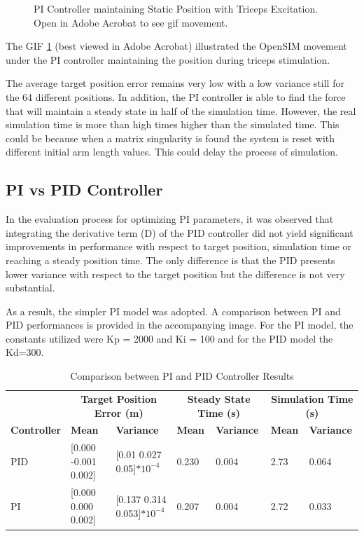 \begin{figure}[h]
    \centering
    \caption{PI Controller maintaining Static Position with Triceps Excitation. Open in Adobe Acrobat to see gif movement.}
    \label{gif:PICONTROLLER1}
\end{figure}

The GIF \ref{gif:PICONTROLLER1} (best viewed in Adobe Acrobat) illustrated the OpenSIM movement under the PI controller  maintaining the position during triceps stimulation.

The average target position error remains very low with a low variance still for the 64 different positions. In addition, the PI controller is able to find the force that will maintain a steady state in half of the simulation time. However, the real simulation time is more than high times higher than the simulated time. This could be because when a matrix singularity is found the system is reset with different initial arm length values. This could delay the process of simulation. 

\newpage
\subsection{PI vs PID Controller}

In the evaluation process for optimizing PI parameters, it was observed that integrating the derivative term (D) of the PID controller did not yield significant improvements in performance with respect to target position, simulation time or reaching a steady position time. The only difference is that the PID presents lower variance with respect to the target position but the difference is not very substantial. 

As a result, the simpler PI model was adopted. A comparison between PI and PID performances is provided in the accompanying image. For the PI model, the constants utilized were Kp = 2000 and Ki = 100 and for the PID model the Kd=300.

\begin{table}[h]
    \centering
    \tiny %
    \caption{Comparison between PI and PID Controller Results}
    \begin{tabularx}{\linewidth}{|l|X|X|X|X|X|X|}
        \hline
        & \multicolumn{2}{c|}{\textbf{Target Position Error (m)}} & \multicolumn{2}{c|}{\textbf{Steady State Time (s)}} & \multicolumn{2}{c|}{\textbf{Simulation Time (s)}} \\
        \cline{2-7}
        \textbf{Controller} & \textbf{Mean} & \textbf{Variance} & \textbf{Mean} & \textbf{Variance} & \textbf{Mean} & \textbf{Variance} \\
        \hline
        PID & [0.000 -0.001 0.002] & [0.01 0.027 0.05]$*10^{-4}$ &  0.230 & 0.004 & 2.73 & 0.064 \\
        \hline
        PI  & [0.000 0.000 0.002] & [0.137 0.314 0.053]$*10^{-4}$ &  0.207 & 0.004 & 2.72 & 0.033 \\
        \hline
    \end{tabularx}
\end{table}

